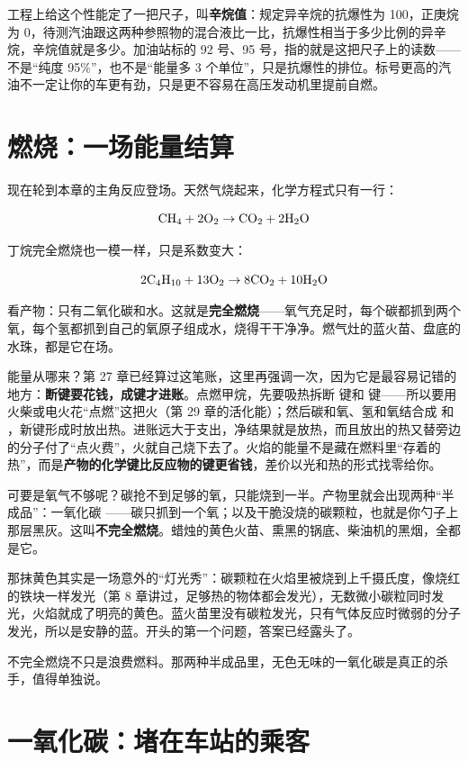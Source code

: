 工程上给这个性能定了一把尺子，叫\textbf{辛烷值}：规定异辛烷的抗爆性为 100，正庚烷为 0，待测汽油跟这两种参照物的混合液比一比，抗爆性相当于多少比例的异辛烷，辛烷值就是多少。加油站标的 92 号、95 号，指的就是这把尺子上的读数——不是“纯度 95\%”，也不是“能量多 3 个单位”，只是抗爆性的排位。标号更高的汽油不一定让你的车更有劲，只是更不容易在高压发动机里提前自燃。

\section{燃烧：一场能量结算}

现在轮到本章的主角反应登场。天然气烧起来，化学方程式只有一行：

\[\mathrm{CH_4} + \mathrm{2O_2} \rightarrow \mathrm{CO_2} + \mathrm{2H_2O}\]

丁烷完全燃烧也一模一样，只是系数变大：

\[\mathrm{2C_4H_{10}} + \mathrm{13O_2} \rightarrow \mathrm{8CO_2} + \mathrm{10H_2O}\]

看产物：只有二氧化碳和水。这就是\textbf{完全燃烧}——氧气充足时，每个碳都抓到两个氧，每个氢都抓到自己的氧原子组成水，烧得干干净净。燃气灶的蓝火苗、盘底的水珠，都是它在场。

能量从哪来？第 27 章已经算过这笔账，这里再强调一次，因为它是最容易记错的地方：\textbf{断键要花钱，成键才进账}。点燃甲烷，先要吸热拆断  键和  键——所以要用火柴或电火花“点燃”这把火（第 29 章的活化能）；然后碳和氧、氢和氧结合成  和 ，新键形成时放出热。进账远大于支出，净结果就是放热，而且放出的热又替旁边的分子付了“点火费”，火就自己烧下去了。火焰的能量不是藏在燃料里“存着的热”，而是\textbf{产物的化学键比反应物的键更省钱}，差价以光和热的形式找零给你。

可要是氧气不够呢？碳抢不到足够的氧，只能烧到一半。产物里就会出现两种“半成品”：一氧化碳 ——碳只抓到一个氧；以及干脆没烧的碳颗粒，也就是你勺子上那层黑灰。这叫\textbf{不完全燃烧}。蜡烛的黄色火苗、熏黑的锅底、柴油机的黑烟，全都是它。

那抹黄色其实是一场意外的“灯光秀”：碳颗粒在火焰里被烧到上千摄氏度，像烧红的铁块一样发光（第 8 章讲过，足够热的物体都会发光），无数微小碳粒同时发光，火焰就成了明亮的黄色。蓝火苗里没有碳粒发光，只有气体反应时微弱的分子发光，所以是安静的蓝。开头的第一个问题，答案已经露头了。

不完全燃烧不只是浪费燃料。那两种半成品里，无色无味的一氧化碳是真正的杀手，值得单独说。

\section{一氧化碳：堵在车站的乘客}


